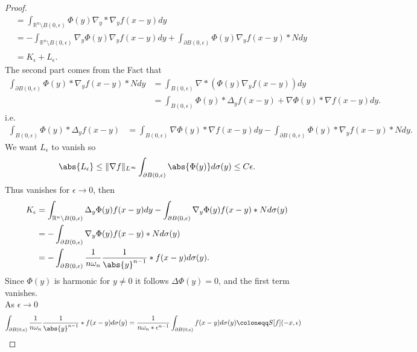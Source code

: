 \begin{proof}
\begin{align*}
               &= \int_{\mathbb{R}^{n} \setminus B(0,\epsilon) } \Phi(y) \nabla_y * \nabla_y f(x-y) dy \\
               &= - \int_{\mathbb{R}^{n} \setminus B(0,\epsilon) } \nabla_y  \Phi(y) \nabla_y f(x-y) dy  + \int_{\partial B(0,\epsilon) } \Phi(y)  \nabla_y f(x-y) * N dy \\\\
               &= K_\epsilon + L_\epsilon
  .\end{align*}
  The second part comes from the Fact that 
  \begin{align*}
    \int_{\partial B(0,\epsilon) } \Phi(y) * \nabla_y f(x-y) * N dy &= \int_{B(0,\epsilon)}  \nabla *(\Phi(y) \nabla_y f(x-y)) dy\\
                                                                             &= \int_{B(0,\epsilon)} \Phi(y) * \Delta_y f(x-y) + \nabla \Phi(y) * \nabla f(x-y) dy
  .\end{align*}
  i.e.
  \begin{align*}
    \int_{B(0,\epsilon)} \Phi(y) * \Delta_y f(x-y) &=  \int_{B(0,\epsilon)}  \nabla \Phi(y) * \nabla f(x-y) dy - \int_{\partial B(0,\epsilon) } \Phi(y) * \nabla_y f(x-y) * N dy 
  .\end{align*}
  We want $L_\epsilon$ to vanish so 
  \begin{align*}
    \abs{L_\epsilon} \le  \|\nabla f\|_{L^{\infty} } \int_{\partial B(0,\epsilon)} \abs{\Phi(y)} d \sigma(y) \le C\epsilon
  .\end{align*}
  Thus vanishes for $\epsilon \to 0$, then 
  \begin{align*}
    K_\epsilon &= \int_{\mathbb{R}^{n} \setminus B(0,\epsilon) } \Delta_y \Phi(y)f(x-y) dy - \int_{\partial B(0,\epsilon)} \nabla_y \Phi(y) f(x-y) * N d \sigma(y)\\
               &= - \int_{\partial B(0,\epsilon)} \nabla_y \Phi(y)f(x-y) * N d \sigma(y) \\
               &= - \int_{\partial B(0,\epsilon)} \frac{1}{n \omega_n} \frac{1}{\abs{y}^{n-1} }*f(x-y)d \sigma(y)
  .\end{align*}
  Since $\Phi(y)$ is harmonic for $y\neq 0$ it follows $\Delta \Phi(y) = 0$, and the first term vanishes.\\
  As $\epsilon \to 0$ 
  \begin{align*}
    \int_{\partial B(0,\epsilon)} \frac{1}{n \omega_n} \frac{1}{\abs{y}^{n-1} }*f(x-y)d \sigma(y) &=  \frac{1}{n \omega_n*\epsilon ^{n-1} } \int_{\partial B(0,\epsilon)} f(x-y)d \sigma(y) \coloneqq  S[f](-x,\epsilon)

\end{align*}
\end{proof}
